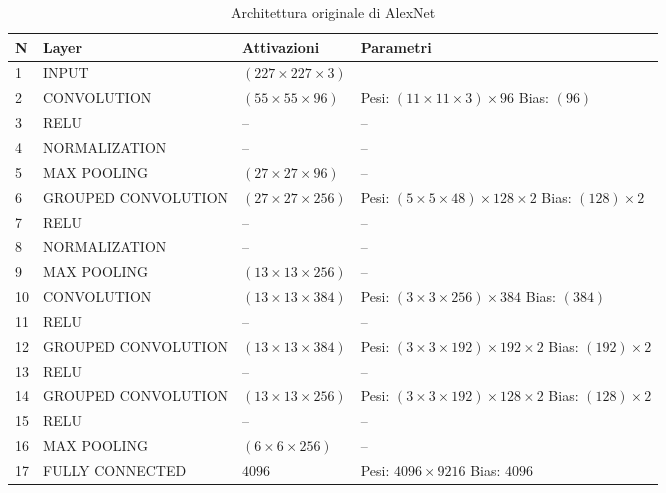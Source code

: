 \begin{table}[h]
\caption{Architettura originale di AlexNet}
\label{tab_arc_alexnet}
\begin{tabularx}{\textwidth}{@{}llll@{}}
\toprule
N & Layer           & Attivazioni & Parametri \\ \midrule
1  &
INPUT &
$(227\times 227\times 3)$ &
\\ \midrule
2  & CONVOLUTION     & $(55\times 55\times 96)$ &\acapo{Pesi: $(11\times 11\times 3)\times 96$\\Bias: $(96)$} \\
3  & RELU            & --            & --\\
4  & NORMALIZATION   & --            & --\\
5  & MAX POOLING     & $(27\times 27\times 96)$ & -- \\ \midrule
6  & GROUPED CONVOLUTION     & $(27\times 27\times 256)$ & \acapo{Pesi: $(5\times 5\times 48)\times 128\times 2$\\Bias: $(128)\times 2$} \\
7  & RELU            & --            & --          \\
8  & NORMALIZATION   & --            & --          \\
9  & MAX POOLING     & $(13\times 13\times 256)$            &--           \\ \midrule
10 & CONVOLUTION     & $(13\times 13\times 384)$            & \acapo{Pesi: $(3\times 3\times 256)\times 384$\\Bias: $(384)$}          \\
11 & RELU            & --            &   --        \\ \midrule
12 & GROUPED CONVOLUTION     & $(13\times 13\times 384)$ & \acapo{Pesi: $(3\times 3\times 192)\times 192\times 2$\\Bias: $(192)\times 2$}  \\
13 & RELU            & --            &       --    \\ \midrule
14 & GROUPED CONVOLUTION     & $(13\times 13\times 256)$            & \acapo{Pesi: $(3\times 3\times 192)\times 128\times 2$\\Bias: $(128)\times 2$}\\
15 & RELU            & --            &   --        \\
16 & MAX POOLING     &$(6\times 6\times 256)$            &     --      \\ \midrule
17 & FULLY CONNECTED &$4096$& \acapo{Pesi: $4096\times 9216$\\Bias: $4096$} \\ 

\end{tabularx}
\end{table}
